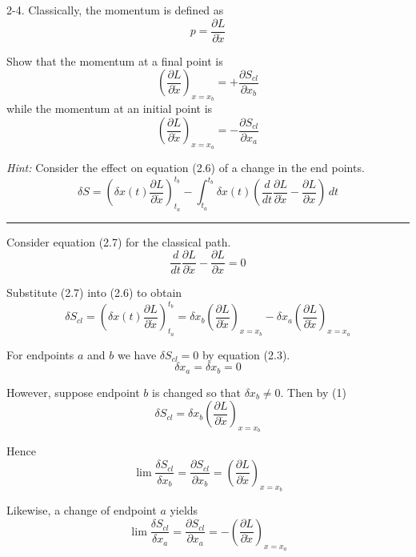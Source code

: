 \documentclass[12pt]{article}
\begin{document}
2-4.
Classically, the momentum is defined as
\begin{equation*}
p=\frac{\partial L}{\partial\dot x}
\tag{2.10}
\end{equation*}

Show that the momentum at a final point is
\begin{equation*}
\left(\frac{\partial L}{\partial\dot x}\right)_{x=x_b}
=+\frac{\partial S_{cl}}{\partial x_b}
\tag{2.11}
\end{equation*}
while the momentum at an initial point is
\begin{equation*}
\left(\frac{\partial L}{\partial\dot x}\right)_{x=x_a}
=-\frac{\partial S_{cl}}{\partial x_a}
\end{equation*}

{\it Hint:} Consider the effect on equation (2.6)
of a change in the end points.
\begin{equation*}
\delta S=\left(\delta x(t)\frac{\partial L}{\partial\dot x}\right)_{t_a}^{t_b}
-\int_{t_a}^{t_b}\delta x(t)
\left(\frac{d}{dt}\frac{\partial L}{\partial\dot x}
-\frac{\partial L}{\partial x}\right)\,dt
\tag{2.6}
\end{equation*}

\bigskip
\hrule

\bigskip
Consider equation (2.7) for the classical path.
\begin{equation*}
\frac{d}{dt}\frac{\partial L}{\partial\dot x}
-\frac{\partial L}{\partial x}=0
\tag{2.7}
\end{equation*}

Substitute (2.7) into (2.6) to obtain
\begin{equation*}
\delta S_{cl}=\left(\delta x(t)\frac{\partial L}{\partial\dot x}\right)_{t_a}^{t_b}
=\delta x_b\left(\frac{\partial L}{\partial\dot x}\right)_{x=x_b}
-\delta x_a\left(\frac{\partial L}{\partial\dot x}\right)_{x=x_a}
\tag{1}
\end{equation*}

For endpoints $a$ and $b$ we have $\delta S_{cl}=0$ by equation (2.3).
\begin{equation*}
\delta x_a=\delta x_b=0
\tag{2.3}
\end{equation*}

However, suppose endpoint $b$ is changed so that $\delta x_b\ne0$.
Then by (1)
\begin{equation*}
\delta S_{cl}=\delta x_b\left(\frac{\partial L}{\partial\dot x}\right)_{x=x_b}
\end{equation*}

Hence
\begin{equation*}
\lim\frac{\delta S_{cl}}{\delta x_b}=\frac{\partial S_{cl}}{\partial x_b}
=\left(\frac{\partial L}{\partial\dot x}\right)_{x=x_b}
\end{equation*}

Likewise, a change of endpoint $a$ yields
\begin{equation*}
\lim\frac{\delta S_{cl}}{\delta x_a}=\frac{\partial S_{cl}}{\partial x_a}
=-\left(\frac{\partial L}{\partial\dot x}\right)_{x=x_a}
\end{equation*}
\end{document}
